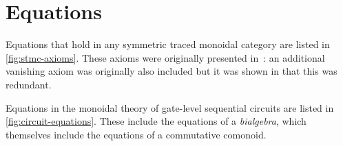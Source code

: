 \section{Equations}
\label{app:equations}

Equations that hold in any symmetric traced monoidal category are listed in
\cref{fig:stmc-axioms}.
These axioms were originally presented in~\cite{joyal1996traced}: an additional
vanishing axiom was originally also included but it was shown in
\cite{hasegawa2009traced} that this was redundant.

Equations in the monoidal theory of gate-level sequential circuits are listed in
\cref{fig:circuit-equations}.
These include the equations of a \emph{bialgebra}, which themselves include the
equations of a commutative comonoid.


